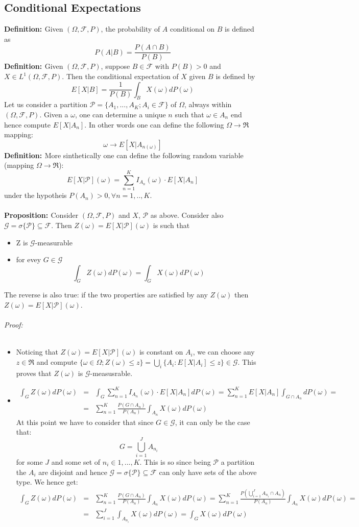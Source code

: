 \documentclass[a4paper,10pt]{report}
\theoremstyle{plain}
\theoremstyle{definition}
\newcommand\be{\begin{eqnarray}}    %
\newcommand\ee{\end{eqnarray}}
\newcommand{\DEF} {{\bf{Definition: }}}
\newcommand{\PROP} {{\bf{Proposition: }}}
\newcommand{\PROOF} {{\emph{Proof: \\ \\}}}
\newcommand{\FF} {\mathcal{F} }
\begin{document}
\subsection{Conditional Expectations}
\DEF Given $(\Omega, \FF, P)$, the probability of $A$ conditional on $B$ is defined as
\[
P(A|B)=\frac{P(A\cap B)}{P(B)}
\]
\DEF Given $(\Omega, \FF, P)$, suppose $B\in \FF$ with $P(B)>0$ and $X\in L^1(\Omega, \FF, P)$. Then the conditional expectation of $X$ given $B$ is defined by
\[
E[X|B]=\frac{1}{P(B)}\int_B X(\omega) dP(\omega)
\]
Let us consider a partition $\mathcal{P}=\{A_1,...,A_K; A_i\in \FF\}$ of $\Omega$, always within $(\Omega, \FF, P)$. Given a $\omega$, one can determine a unique $n$ such that $\omega \in A_n$ end hence compute $E[X|A_n]$. In other words one can define the following $\Omega\rightarrow \Re$ mapping:
\[
\omega\rightarrow E[X|A_{n(\omega)}]
\]
\DEF More sinthetically one can define the following random variable (mapping $\Omega\rightarrow \Re$):
\[
E[X|\mathcal{P}](\omega)=\sum_{n=1}^K I_{A_n}(\omega) \cdot E[X|A_n]
\]
under the hypotheis $P(A_n)>0, \forall n=1,..,K$. \\ \\
\PROP Consider $(\Omega, \FF, P)$ and $X$, $\mathcal{P}$ as above. Consider also $\mathcal{G}=\sigma\{\mathcal{P}\}\subseteq \FF$. Then $Z(\omega)=E[X|\mathcal{P}](\omega)$ is such that
\begin{itemize}
\item Z is $\mathcal{G}$-measurable
\item for evey $G\in \mathcal{G}$ 
\[
\int_G Z(\omega)dP(\omega) = \int_G X(\omega) dP(\omega)
\]
\end{itemize}
The reverse is also true: if the two properties  are satisfied by any $Z(\omega)$ then $Z(\omega)=E[X|\mathcal{P}](\omega)$. \\ \\
\PROOF
\begin{itemize}
\item Noticing that $Z(\omega)=E[X|\mathcal{P}](\omega)$ is constant on $A_i$, we can choose any $z\in \Re$ and compute $\{\omega\in \Omega; Z(\omega)\leq z\}=\bigcup_i \{ A_i : E[X|A_i]\leq z\}\in \mathcal{G}$. This proves that $Z(\omega)$ is $\mathcal{G}$-measusrable.
\item 
\be
\nonumber
\int_G Z(\omega)dP(\omega)&=&\int_G \sum_{n=1}^K I_{A_n}(\omega) \cdot E[X|A_n] dP(\omega)= \sum_{n=1}^K E[X|A_n] \int_{G\cap A_n} dP(\omega)= \\ 
\nonumber
&=&\sum_{n=1}^K \frac{P(G\cap A_n)}{P(A_n)} \int_{A_n} X(\omega) dP(\omega)  
\ee
At this point we have to consider that since $G\in \mathcal{G}$, it can only be the case that:
\[
G=\bigcup_{i=1}^J A_{n_i}
\]
for some $J$ and some set of $n_i\in 1,...,K$. This is so since being $\mathcal{P}$ a partition the $A_i$ are disjoint and hence $\mathcal{G}=\sigma\{\mathcal{P}\}\subseteq \FF$ can only have sets of the above type.
We hence get:
\be
\int_G Z(\omega)dP(\omega)&=&\sum_{n=1}^K \frac{P(G\cap A_n)}{P(A_n)} \int_{A_n} X(\omega) dP(\omega) =\sum_{n=1}^K \frac{P(\bigcup_{i=1}^J A_{n_i}\cap A_n)}{P(A_n)} \int_{A_n} X(\omega) dP(\omega)=  \\
&=&\sum_{i=1}^J  \int_{A_{n_i}} X(\omega) dP(\omega)=\int_G X(\omega)dP(\omega)
\ee
\end{itemize}
\end{document}
